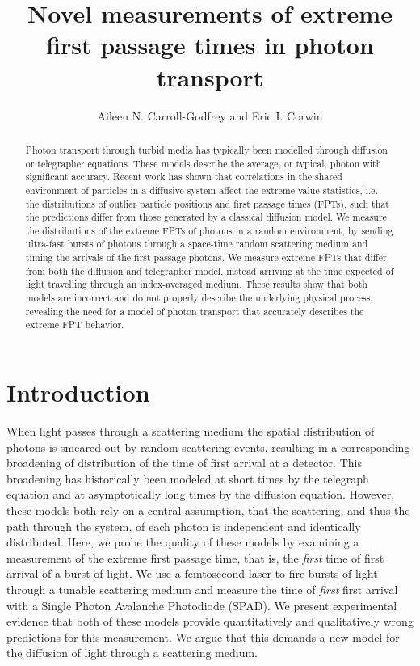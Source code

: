 \documentclass[floatfix,aps,prl,reprint,groupedaddress]{revtex4-2}
\begin{document}
\title{Novel measurements of extreme first passage times in photon transport}
\author{Aileen N. Carroll-Godfrey and Eric I. Corwin}
\begin{abstract}
    Photon transport through turbid media has typically been modelled through diffusion or telegrapher equations. These models describe the average, or typical, photon with significant accuracy. Recent work has shown that correlations in the shared environment of particles in a diffusive system affect the extreme value statistics, i.e. the distributions of outlier particle positions and first passage times (FPTs), such that the predictions differ from those generated by a classical diffusion model. We measure the distributions of the extreme FPTs of photons in a random environment, by sending ultra-fast bursts of photons through a space-time random scattering medium and timing the arrivals of the first passage photons. We measure extreme FPTs that differ from both the diffusion and telegrapher model, instead arriving at the time expected of light travelling through an index-averaged medium. These results show that both models are incorrect and do not properly describe the underlying physical process, revealing the need for a model of photon transport that accurately describes the extreme FPT behavior.
\end{abstract}
\maketitle

\section{Introduction}

When light passes through a scattering medium the spatial distribution of photons is smeared out by random scattering events, resulting in a corresponding broadening of distribution of the time of first arrival at a detector.  This broadening has historically been modeled at short times by the telegraph equation and at asymptotically long times by the diffusion equation.  However, these models both rely on a central assumption, that the scattering, and thus the path through the system, of each photon is independent and identically distributed.  Here, we probe the quality of these models by examining a measurement of the extreme first passage time, that is, the \textit{first} time of first arrival of a burst of light.  We use a femtosecond laser to fire bursts of light through a tunable scattering medium and measure the time of \textit{first} first arrival with a Single Photon Avalanche Photodiode (SPAD).  We present experimental evidence that both of these models provide quantitatively and qualitatively wrong predictions for this measurement.  We argue that this demands a new model for the diffusion of light through a scattering medium.
\end{document}
